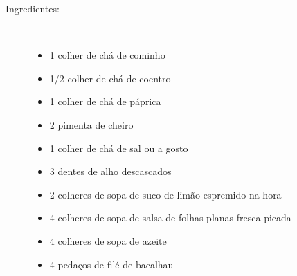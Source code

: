 \documentclass [11pt, papel de carta] {article}
\begin{document}
\begin {description}

\item [Ingredientes:] \ \\
\begin {itemize}
\item 1 colher de chá de cominho
\item 1/2 colher de chá de coentro
\item 1 colher de chá de páprica
\item 2 pimenta de cheiro
\item 1 colher de chá de sal ou a gosto
\item 3 dentes de alho descascados
\item 2 colheres de sopa de suco de limão espremido na hora
\item 4 colheres de sopa de salsa de folhas planas fresca picada
\item 4 colheres de sopa de azeite
\item 4 pedaços de filé de bacalhau
\end {itemize}



\end{description}
\end{document}
